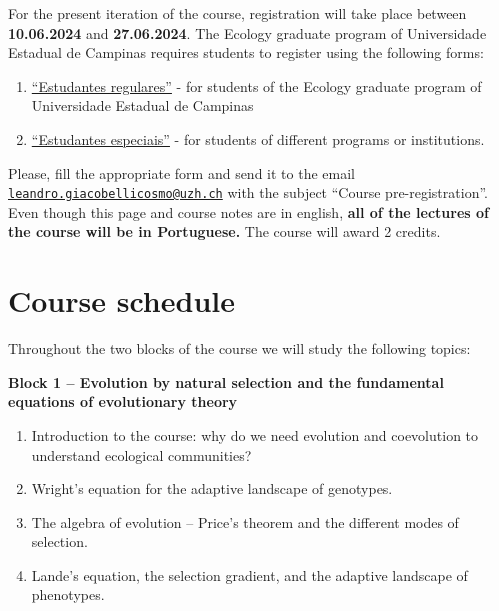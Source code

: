 \documentclass[
]{book}
\providecommand{\tightlist}{%
  \setlength{\itemsep}{0pt}\setlength{\parskip}{0pt}}
\begin{document}
For the present iteration of the course, registration will take place between \textbf{10.06.2024} and \textbf{27.06.2024}. The Ecology graduate program of Universidade Estadual de Campinas requires students to register using the following forms:

\begin{enumerate}
\def\labelenumi{\arabic{enumi})}
\tightlist
\item
  \href{https://drive.google.com/file/d/1fRILwlcdKFloCCqvmGSjI9ucSElKDnaJ/view}{``Estudantes regulares''} - for students of the Ecology graduate program of Universidade Estadual de Campinas
\item
  \href{https://www.dac.unicamp.br/sistemas/formularios/inscricao_disciplinas_eventuais_pos_aut.php}{``Estudantes especiais''} - for students of different programs or institutions.
\end{enumerate}

Please, fill the appropriate form and send it to the email \href{mailto:leandro.giacobellicosmo@uzh.ch}{\nolinkurl{leandro.giacobellicosmo@uzh.ch}} with the subject ``Course pre-registration''. Even though this page and course notes are in english, \textbf{all of the lectures of the course will be in Portuguese.} The course will award 2 credits.

\hypertarget{course-schedule}{%
\section{Course schedule}\label{course-schedule}}

Throughout the two blocks of the course we will study the following topics:

\textbf{Block 1 -- Evolution by natural selection and the fundamental equations of evolutionary theory}

\begin{enumerate}
\def\labelenumi{\arabic{enumi})}
\tightlist
\item
  Introduction to the course: why do we need evolution and coevolution to understand ecological communities?
\item
  Wright's equation for the adaptive landscape of genotypes.
\item
  The algebra of evolution -- Price's theorem and the different modes of selection.
\item
  Lande's equation, the selection gradient, and the adaptive landscape of phenotypes.
\end{enumerate}
\end{document}

